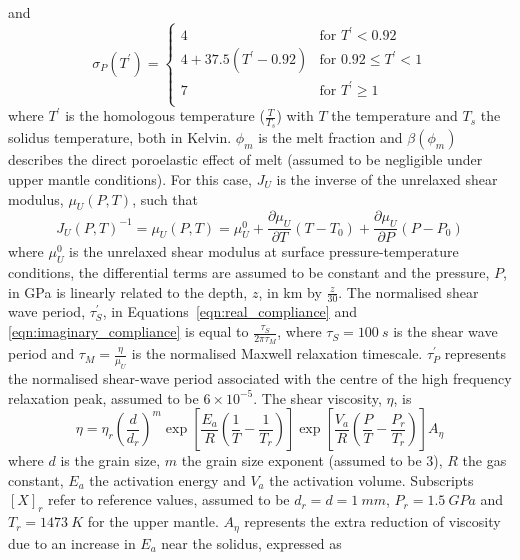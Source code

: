 \documentclass{article}
\begin{document}
and
\begin{equation}
\sigma_P(T^{\prime}) = \begin{cases}
4  &  \text{for }T^{\prime} < 0.92 \\
4+37.5(T^{\prime}-0.92) & \text{for }0.92\leq T^{\prime} < 1 \\
7& \text{for } T^{\prime} \geq 1 \\
\end{cases}
\end{equation}
where $T^{\prime}$ is the homologous temperature ($\frac{T}{T_{s}}$) with $T$ the temperature and $T_s$ the solidus temperature, both in Kelvin. $\phi_m$ is the melt fraction and $\beta(\phi_m)$ describes the direct poroelastic effect of melt (assumed to be negligible under upper mantle conditions). For this case, $J_U$ is the inverse of the unrelaxed shear modulus, $\mu_{U}(P,T)$, such that
\begin{equation}
J_{U}(P,T)^{-1} = \mu_U(P,T) = \mu_U^0 + \frac{\partial{\mu_U}}{\partial{T}}(T -T_0)+ \frac{\partial{\mu_U}}{\partial{P}}(P-P_0)
\end{equation}
where $\mu_U^0$ is the unrelaxed shear modulus at surface pressure-temperature conditions, the differential terms are assumed to be constant and the pressure, $P$, in GPa is linearly related to the depth, $z$, in km by $\frac{z}{30}$. The normalised shear wave period, $\tau_S^{\prime}$, in Equations~\eqref{eqn:real_compliance} and \eqref{eqn:imaginary_compliance} is equal to $\frac{\tau_S}{2\pi\tau_M}$, where $\tau_S = 100~\si{s}$ is the shear wave period and $\tau_M = \frac{\eta}{\mu_U}$ is the normalised Maxwell relaxation timescale. $\tau_P^{\prime}$ represents the normalised shear-wave period associated with the centre of the high frequency relaxation peak, assumed to be $6 \times 10^{-5}$. The shear viscosity, $\eta$, is
\begin{equation}
\eta = \eta_r \left(\frac{d}{d_r}\right)^{m} \exp \left[ \frac{E_a}{R}\left(\frac{1}{T}-\frac{1}{T_r}\right) \right] \exp \left[ \frac{V_a}{R}\left(\frac{P}{T}-\frac{P_r}{T_r}\right) \right] A_{\eta}
\label{eq:eta}
\end{equation}
where $d$ is the grain size, $m$ the grain size exponent (assumed to be 3), $R$ the gas constant, $E_a$ the activation energy and $V_a$ the activation volume. Subscripts $[X]_r$ refer to reference values, assumed to be $d_r = d = 1~\si{mm}$, $P_r = 1.5~\si{GPa}$ and $T_r = 1473~\si{K}$ for the upper mantle. $A_{\eta}$ represents the extra reduction of viscosity due to an increase in $E_a$ near the solidus, expressed as
\end{document}
